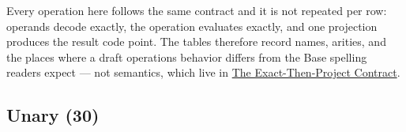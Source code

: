 Every operation here follows the same contract and it is not repeated per row: operands decode exactly, the operation evaluates exactly, and one projection produces the result code point. The tables therefore record names, arities, and the places where a draft operation{\textquotesingle}s behavior differs from the Base spelling readers expect — not semantics, which live in \href{concept\_\allowbreak{}exact\_\allowbreak{}then\_\allowbreak{}project.md}{The Exact-Then-Project Contract}.



\subsection{Unary (30)}



\label{2812026322430809105-dup1}{}



